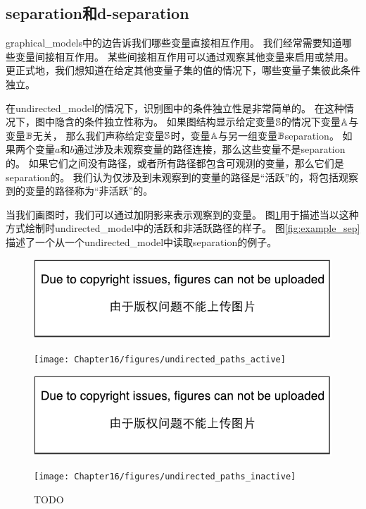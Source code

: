 \subsection{\gls{separation}和d-\gls{separation}}
\label{sec:separation_and_d_separation}

\gls{graphical_models}中的边告诉我们哪些变量直接相互作用。
我们经常需要知道哪些变量间接相互作用。 
某些间接相互作用可以通过观察其他变量来启用或禁用。
更正式地，我们想知道在给定其他变量子集的值的情况下，哪些变量子集彼此条件独立。


在\gls{undirected_model}的情况下，识别图中的条件独立性是非常简单的。 
在这种情况下，图中隐含的条件独立性称为。
如果图结构显示给定变量$\mathbb{S}$的情况下变量$\mathbb{A}$与变量$\mathbb{B}$无关，
那么我们声称给定变量$\mathbb{S}$时，变量$\mathbb{A}$与另一组变量$\mathbb{B}$\gls{separation}。
如果两个变量$a$和$b$通过涉及未观察变量的路径连接，那么这些变量不是\gls{separation}的。
如果它们之间没有路径，或者所有路径都包含可观测的变量，那么它们是\gls{separation}的。
我们认为仅涉及到未观察到的变量的路径是“活跃”的，将包括观察到的变量的路径称为“非活跃”的。


当我们画图时，我们可以通过加阴影来表示观察到的变量。
图\ref{fig:undirected_paths_active}用于描述当以这种方式绘制时\gls{undirected_model}中的活跃和非活跃路径的样子。
图\ref{fig:example_sep}描述了一个从一个\gls{undirected_model}中读取\gls{separation}的例子。


\begin{figure}[!htb]
\ifOpenSource
\centerline{\includegraphics{figure.pdf}}
\else
	\centerline{\texttt{[image: Chapter16/figures/undirected\_paths\_active]}}
\fi
\ifOpenSource
\centerline{\includegraphics{figure.pdf}}
\else
	\centerline{\texttt{[image: Chapter16/figures/undirected\_paths\_inactive]}}	
\fi
	\caption{TODO}
	\label{fig:undirected_paths_active}
\end{figure}

